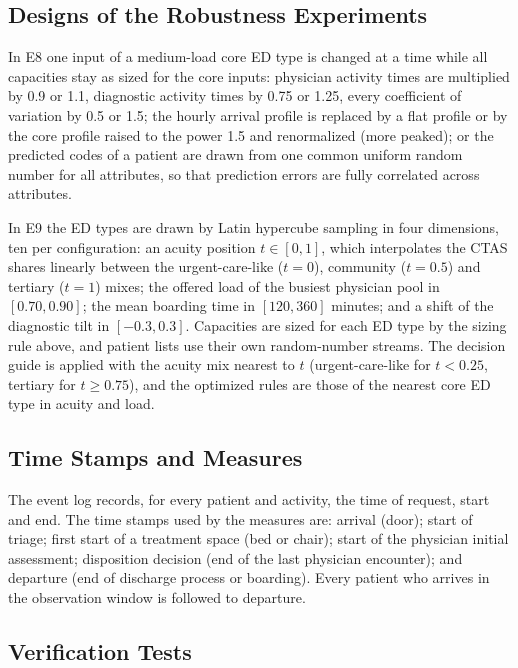 \subsection{Designs of the Robustness Experiments}

In E8 one input of a medium-load core ED type is changed at a time while all capacities stay as sized for the core inputs: physician activity times are multiplied by 0.9 or 1.1, diagnostic activity times by 0.75 or 1.25, every coefficient of variation by 0.5 or 1.5; the hourly arrival profile is replaced by a flat profile or by the core profile raised to the power 1.5 and renormalized (more peaked); or the predicted codes of a patient are drawn from one common uniform random number for all attributes, so that prediction errors are fully correlated across attributes.

In E9 the \NOosTypes{} ED types are drawn by Latin hypercube sampling in four dimensions, ten per configuration: an acuity position $t\in[0,1]$, which interpolates the CTAS shares linearly between the urgent-care-like ($t=0$), community ($t=0.5$) and tertiary ($t=1$) mixes; the offered load of the busiest physician pool in $[0.70,0.90]$; the mean boarding time in $[120,360]$ minutes; and a shift of the diagnostic tilt in $[-0.3,0.3]$. Capacities are sized for each ED type by the sizing rule above, and patient lists use their own random-number streams. The decision guide is applied with the acuity mix nearest to $t$ (urgent-care-like for $t<0.25$, tertiary for $t\geq0.75$), and the optimized rules are those of the nearest core ED type in acuity and load.

\subsection{Time Stamps and Measures}

The event log records, for every patient and activity, the time of request, start and end. The time stamps used by the measures are: arrival (door); start of triage; first start of a treatment space (bed or chair); start of the physician initial assessment; disposition decision (end of the last physician encounter); and departure (end of discharge process or boarding). Every patient who arrives in the observation window is followed to departure.

\subsection{Verification Tests}

